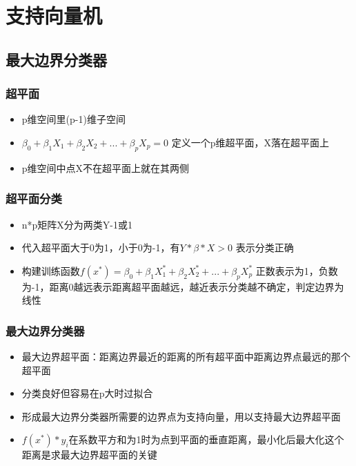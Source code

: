 \documentclass[]{book}
\providecommand{\tightlist}{%
  \setlength{\itemsep}{0pt}\setlength{\parskip}{0pt}}
\begin{document}
\section{支持向量机}

\subsection{最大边界分类器}

\subsubsection{超平面}

\begin{itemize}
\tightlist
\item
  p维空间里(p-1)维子空间
\item
  \(\beta_0 + \beta_1 X_1 + \beta_2 X_2 + ... + \beta_p X_p = 0\) 定义一个p维超平面，X落在超平面上
\item
  p维空间中点X不在超平面上就在其两侧
\end{itemize}

\subsubsection{超平面分类}

\begin{itemize}
\tightlist
\item
  n*p矩阵X分为两类Y-1或1
\item
  代入超平面大于0为1，小于0为-1，有\(Y*\beta*X > 0\) 表示分类正确
\item
  构建训练函数\(f(x^*) = \beta_0 + \beta_1 X_1^* + \beta_2 X_2^* + ... + \beta_p X_p^*\) 正数表示为1，负数为-1，距离0越远表示距离超平面越远，越近表示分类越不确定，判定边界为线性
\end{itemize}

\hypertarget{-1}{%
\subsubsection{最大边界分类器}\label{-1}}

\begin{itemize}
\tightlist
\item
  最大边界超平面：距离边界最近的距离的所有超平面中距离边界点最远的那个超平面
\item
  分类良好但容易在p大时过拟合
\item
  形成最大边界分类器所需要的边界点为支持向量，用以支持最大边界超平面
\item
  \(f(x^*)*y_i\)在系数平方和为1时为点到平面的垂直距离，最小化后最大化这个距离是求最大边界超平面的关键
\end{itemize}
\end{document}
